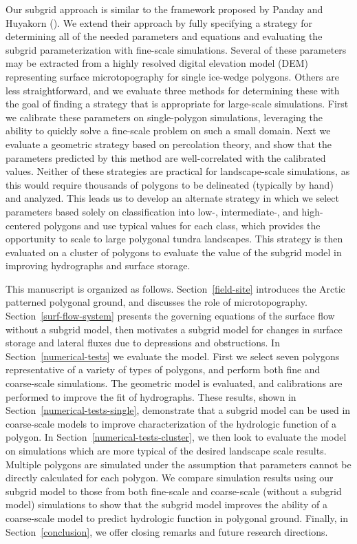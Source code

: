 Our subgrid approach is similar to the framework proposed by Panday and Huyakorn (). We extend their approach by fully specifying a strategy for determining all of the needed parameters and equations and evaluating the subgrid parameterization with fine-scale simulations.
Several of these parameters may be extracted from a highly resolved digital elevation model (DEM) representing surface microtopography for single ice-wedge polygons.
Others are less straightforward, and we evaluate three methods for determining these with the goal of finding a strategy that is appropriate for large-scale simulations.
First we calibrate these parameters on single-polygon simulations, leveraging the ability to quickly solve a fine-scale problem on such a small domain.
Next we evaluate a geometric strategy based on percolation theory, and show that the parameters predicted by this method are well-correlated with the calibrated values.
Neither of these strategies are practical for landscape-scale simulations, as this would require thousands of polygons to be delineated (typically by hand) and analyzed.
This leads us to develop an alternate strategy in which we select parameters based solely on classification into low-, intermediate-, and high-centered polygons and use typical values for each class, which provides the opportunity to scale to large polygonal tundra landscapes.
This strategy is then evaluated on a cluster of polygons to evaluate the value of the subgrid model in improving hydrographs and surface storage.

This manuscript is organized as follows. 
Section~\ref{field-site} introduces the Arctic patterned polygonal ground, and discusses the role of microtopography. 
Section~\ref{surf-flow-system} presents the governing equations of the surface flow without a subgrid model, then motivates a subgrid model for changes in surface storage and lateral fluxes due to depressions and obstructions. 
In Section~\ref{numerical-tests} we evaluate the model.  
First we select seven polygons representative of a variety of types of polygons, and perform both fine and coarse-scale simulations.
The geometric model is evaluated, and calibrations are performed to improve the fit of hydrographs.
These results, shown in Section~\ref{numerical-tests-single}, demonstrate that a subgrid model can be used in coarse-scale models to improve characterization of the hydrologic function of a polygon.
In Section~\ref{numerical-tests-cluster}, we then look to evaluate the model on simulations which are more typical of the desired landscape scale results.  
Multiple polygons are simulated under the assumption that parameters cannot be directly calculated for each polygon.
We compare simulation results using our subgrid model to those from both fine-scale and coarse-scale (without a subgrid model) simulations to show that the subgrid model improves the ability of a coarse-scale model to predict hydrologic function in polygonal ground. 
Finally, in Section~\ref{conclusion}, we offer closing remarks and future research directions. 


